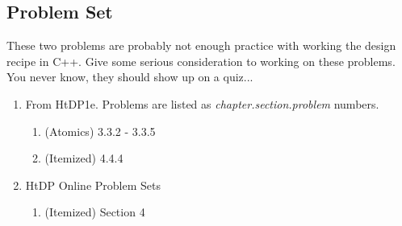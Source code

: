\documentclass[]{tufte-handout}
\begin{document}
\subsection{Problem Set}

These two problems are probably not enough practice with working the design recipe in C++.  Give some serious consideration to working on these problems. You never know, they should show up on a quiz...

\begin{enumerate}
\item From HtDP1e. Problems are listed as \textit{chapter.section.problem} numbers.
\begin{enumerate}
\item (Atomics) 3.3.2 - 3.3.5
\item (Itemized) 4.4.4
\end{enumerate}
\item HtDP Online Problem Sets
\begin{enumerate}
\item (Itemized) Section 4
\end{enumerate}
\end{enumerate}
\end{document}
